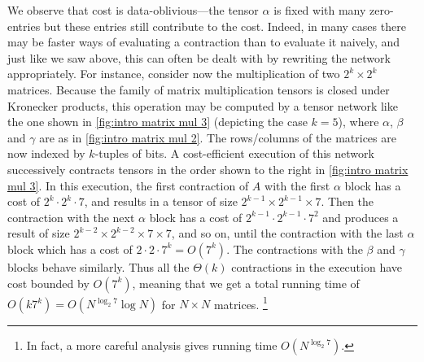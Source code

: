 We observe that cost is data-oblivious---the tensor $\alpha$ is fixed with many
zero-entries but these entries still contribute to the cost.  Indeed, in many cases there may be faster ways of evaluating a contraction than to evaluate it naively, and just like we saw above, this can often be dealt with by rewriting the network appropriately.
For instance, consider now the multiplication of two $2^k \times 2^k$
matrices.  Because the family of matrix multiplication tensors is closed under
Kronecker products, this operation may be computed by a tensor
network like the one shown in \eqref{fig:intro matrix mul 3}
(depicting the case $k=5$), where $\alpha$, $\beta$ and $\gamma$ are
as in \eqref{fig:intro matrix mul 2}.  The rows/columns of the
matrices are now indexed by $k$-tuples of bits.  A cost-efficient execution of this
network successively contracts tensors in the order shown to the right in \eqref{fig:intro matrix mul 3}.  In this execution, the first contraction of $A$
with the first $\alpha$ block has a cost of $2^k \cdot 2^k \cdot 7$,
and results in a tensor of size $2^{k-1} \times 2^{k-1} \times 7$.
Then the contraction with the next $\alpha$ block has a cost of $2^{k-1} \cdot 2^{k-1} \cdot
7^2$ and produces a result of size $2^{k-2} \times 2^{k-2} \times 7
\times 7$, and so on, until the contraction with the last $\alpha$
block which has a cost of $2 \cdot 2 \cdot 7^k = O(7^k)$.  The contractions with the $\beta$ and $\gamma$ blocks behave similarly.  Thus all the
$\Theta(k)$ contractions in the execution have cost bounded by $O(7^k)$, meaning that
we get a total running time of $O(k 7^k) = O(N^{\log_2 7} \log N)$ for
$N \times N$ matrices.%
\footnote{In fact, a more careful analysis gives running time $O(N^{\log_2 7})$.}{}

